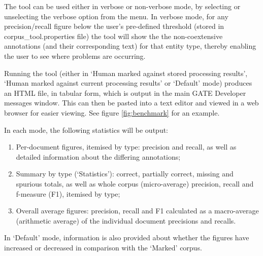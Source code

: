 The tool can be used either in verbose or non-verbose mode, by selecting or
unselecting the verbose option from the menu. In verbose mode, for any
precision/recall figure below the user's pre-defined threshold (stored in
corpus\_tool.properties file) the tool will show the the non-coextensive
annotations (and their corresponding text) for that entity type, thereby enabling
the user to see where problems are occurring.


Running the tool (either in `Human marked against stored processing results',
`Human marked against current processing results' or `Default' mode) produces an
HTML file, in tabular form, which is output in the main GATE Developer messages
window. This can then be pasted into a text editor and viewed in a web
browser for easier viewing. See figure \ref{fig:benchmark} for an example.

In each mode, the following statistics will be output:

\begin{enumerate}
  \item Per-document figures, itemised by type: precision and recall, as well as
  detailed information about the differing annotations;
  \item Summary by type (`Statistics'): correct, partially correct, missing
  and spurious totals, as well as whole corpus (micro-average) precision,
  recall and f-measure (F1), itemised by type;
  \item Overall average figures: precision, recall and F1 calculated as a
  macro-average (arithmetic average) of the individual document precisions and recalls.
\end{enumerate}

In `Default' mode, information is also provided about whether the figures have
increased or decreased in comparison with the `Marked' corpus.

